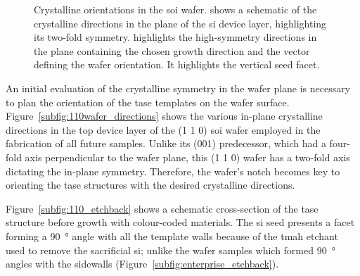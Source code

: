 \begin{figure}
{
    }
    \caption{Crystalline orientations in the \hkl[1 1 0] \acs{soi} wafer.  shows a schematic of the crystalline directions in the plane of the \acs{si} device layer, highlighting its two-fold symmetry.  highlights the high-symmetry directions in the  plane containing the chosen  growth direction and the \hkl[1 1 0] vector defining the wafer orientation. It highlights the vertical  seed facet.}
    \label{fig:110_wafer_properties}
\end{figure}

An initial evaluation of the crystalline symmetry in the wafer plane is necessary to plan the orientation of the \acs{tase} templates on the wafer surface. Figure~\ref{subfig:110wafer_directions} shows the various in-plane crystalline directions in the top device layer of the \hkl(1 1 0) \acs{soi} wafer employed in the fabrication of all future samples. Unlike its \hkl(001) predecessor, which had a four-fold axis perpendicular to the wafer plane, this \hkl(1 1 0) wafer has a two-fold axis dictating the in-plane symmetry. Therefore, the wafer's notch becomes key to orienting the \acs{tase} structures with the desired crystalline directions.
\par
Figure~\ref{subfig:110_etchback} shows a schematic cross-section of the \acs{tase} structure before growth with colour-coded materials. The \acs{si} seed presents a  facet forming a \qty{90}{\degree} angle with all the template walls because of the \acs{tmah} etchant used to remove the sacrificial \acl{si}; unlike the  wafer samples which formed \qty{90}{\degree} angles with the sidewalls (Figure~\ref{subfig:enterprise_etchback}).

